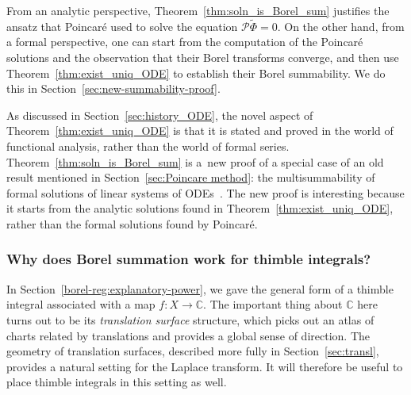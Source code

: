 \documentclass[pdftex]{sigma}
\newcommand{\maps}{\colon}
\newcommand{\C}{\mathbb{C}}
\newcommand{\series}[1]{\tilde{#1}}
\numberwithin{equation}{section}
\begin{document}
From an analytic perspective, Theorem~\ref{thm:soln_is_Borel_sum} justifies the ansatz that Poincar\'e used to solve the equation $\mathcal{P}\series{\Phi} = 0$. On the other hand, from a formal perspective, one can start from the computation of the Poincar\'e solutions and the observation that their Borel transforms converge, and then use Theorem~\ref{thm:exist_uniq_ODE} to establish their Borel summability. We do this in Section~\ref{sec:new-summability-proof}.

As discussed in Section~\ref{sec:history_ODE}, the novel aspect of Theorem~\ref{thm:exist_uniq_ODE} is that it is stated and proved in the world of functional analysis, rather than the world of formal series. Theorem~\ref{thm:soln_is_Borel_sum} is a~new proof of a special case of an old result mentioned in Section~\ref{sec:Poincare method}: the multisummability of formal solutions of linear systems of ODEs~\cite{braaksma2006laplace,ramis1991series}. The new proof is interesting because it starts from the analytic solutions found in Theorem~\ref{thm:exist_uniq_ODE}, rather than the formal solutions found by Poincar\'e.

\subsubsection{Why does Borel summation work for thimble integrals?}\label{sec:why_borel_thimble}
In Section~\ref{borel-reg:explanatory-power}, we gave the general form of a thimble integral associated with a map $f \maps X \to \C$. The important thing about $\C$ here turns out to be its {\em translation surface} structure, which picks out an atlas of charts related by translations and provides a global sense of direction. The geometry of translation surfaces, described more fully in Section~\ref{sec:transl}, provides a natural setting for the Laplace transform. It will therefore be useful to place thimble integrals in this setting as well.
\end{document}
